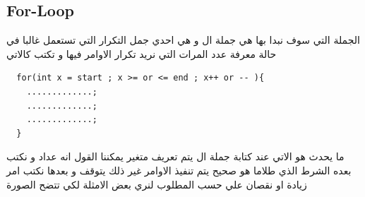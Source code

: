\subsection{For-Loop}
\begin{AR}
  الجملة التي سوف نبدا بها هي جملة ال و هي احدي جمل التكرار التي تستعمل غالبا في حالة معرفة عدد المرات التي نريد تكرار الاوامر فيها و تكتب كالاتي
\end{AR}
\begin{verbatim}
  for(int x = start ; x >= or <= end ; x++ or -- ){
    .............;
    .............;
    .............;
  }
\end{verbatim}
\begin{AR}
  ما يحدث هو الاتي عند كتابة جملة ال  يتم تعريف متغير يمكننا القول انه عداد و نكتب بعده الشرط الذي 
  طلاما هو صحيح يتم تنفيذ الاوامر غير ذلك يتوقف و بعدها نكتب امر زيادة او نقصان علي حسب المطلوب لنري 
  بعض الامثلة لكي تتضح الصورة
\end{AR}

